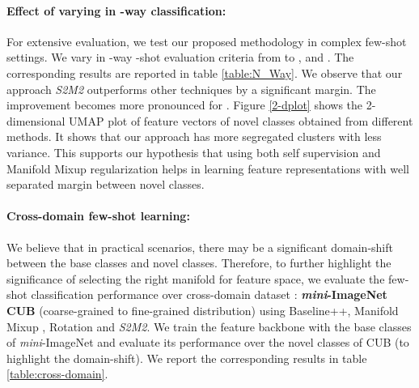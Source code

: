 \documentclass[10pt,twocolumn,letterpaper]{article}
\begin{document}
\paragraph{Effect of varying  in -way classification:}
For extensive evaluation, we test our proposed methodology in complex few-shot settings. We vary  in -way -shot evaluation criteria from  to ,  and . The corresponding results are reported in table \ref{table:N_Way}. We observe that our approach \textit{S2M2} outperforms other techniques by a significant margin. The improvement becomes more pronounced for . Figure \ref{2-dplot} shows the 2-dimensional UMAP \cite{umaplearn} plot of feature vectors of novel classes obtained from different methods. It shows that our approach has more segregated clusters with less variance. This supports our hypothesis that using both self supervision and Manifold Mixup regularization helps in learning feature representations with well separated margin between novel classes. 
\paragraph{Cross-domain few-shot learning:}
We believe that in practical scenarios, there may be a significant domain-shift between the base classes and novel classes. Therefore, to further highlight the significance of selecting the right manifold for feature space, we evaluate the few-shot classification performance over cross-domain dataset : \textbf{\textit{mini}-ImageNet  CUB} (coarse-grained to fine-grained distribution) using Baseline++, Manifold Mixup \cite{verma2019manifold}, Rotation \cite{s4l2019} and \textit{S2M2}.
We train the feature backbone with the base classes of \textit{mini}-ImageNet  and evaluate its performance over the novel classes of CUB (to highlight the domain-shift). We report the corresponding results in table \ref{table:cross-domain}.



\begin{table}[t]
\centering
{}
\label{table:cross-domain}
\end{table}
\end{document}
